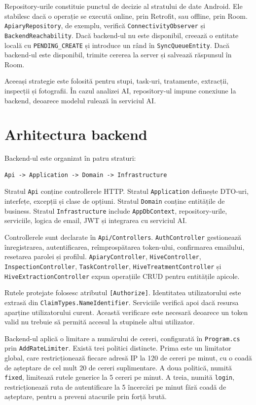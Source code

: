 Repository-urile constituie punctul de decizie al stratului de date Android. Ele stabilesc dacă o operație se execută online, prin Retrofit, sau offline, prin Room. \texttt{ApiaryRepository}, de exemplu, verifică \texttt{ConnectivityObserver} și \texttt{BackendReachability}. Dacă backend-ul nu este disponibil, creează o entitate locală cu \texttt{PENDING\_CREATE} și introduce un rând în \texttt{SyncQueueEntity}. Dacă backend-ul este disponibil, trimite cererea la server și salvează răspunsul în Room.

Aceeași strategie este folosită pentru stupi, task-uri, tratamente, extracții, inspecții și fotografii. În cazul analizei AI, repository-ul impune conexiune la backend, deoarece modelul rulează în serviciul AI.

\section{Arhitectura backend}

Backend-ul este organizat în patru straturi:

\begin{verbatim}
Api -> Application -> Domain -> Infrastructure
\end{verbatim}

Stratul \texttt{Api} conține controllerele HTTP. Stratul \texttt{Application} definește DTO-uri, interfețe, excepții și clase de opțiuni. Stratul \texttt{Domain} conține entitățile de business. Stratul \texttt{Infrastructure} include \texttt{AppDbContext}, repository-urile, serviciile, logica de email, JWT și integrarea cu serviciul AI.

Controllerele sunt declarate în \texttt{Api/Controllers}. \texttt{AuthController} gestionează înregistrarea, autentificarea, reîmprospătarea token-ului, confirmarea emailului, resetarea parolei și profilul. \texttt{ApiaryController}, \texttt{HiveController}, \texttt{InspectionController}, \texttt{TaskController}, \texttt{HiveTreatmentController} și \texttt{HiveExtractionController} expun operațiile CRUD pentru entitățile apicole.

Rutele protejate folosesc atributul \texttt{[Authorize]}. Identitatea utilizatorului este extrasă din \texttt{ClaimTypes.NameIdentifier}. Serviciile verifică apoi dacă resursa aparține utilizatorului curent. Această verificare este necesară deoarece un token valid nu trebuie să permită accesul la stupinele altui utilizator.

Backend-ul aplică o limitare a numărului de cereri, configurată în \texttt{Program.cs} prin \texttt{AddRateLimiter}. Există trei politici distincte. Prima este un limitator global, care restricționează fiecare adresă IP la 120 de cereri pe minut, cu o coadă de așteptare de cel mult 20 de cereri suplimentare. A doua politică, numită \texttt{fixed}, limitează rutele generice la 5 cereri pe minut. A treia, numită \texttt{login}, restricționează ruta de autentificare la 5 încercări pe minut fără coadă de așteptare, pentru a preveni atacurile prin forță brută.

